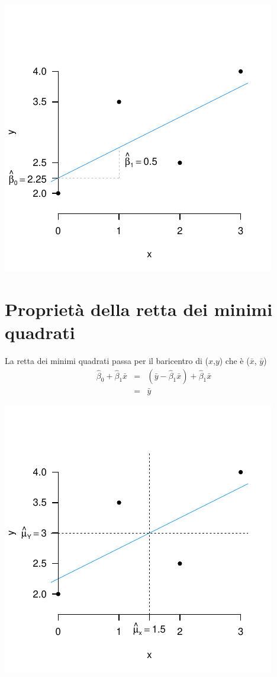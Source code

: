 \documentclass[
  11pt,
]{book}
\theoremstyle{mytheoremstyle}
\theoremstyle{mydefstyle}
\begin{document}
\begin{center}\includegraphics{Appunti_di_Statistica_2025_files/figure-latex/17-regressione-I-42-1} \end{center}

\section{Proprietà della retta dei minimi quadrati}\label{proprietuxe0-della-retta-dei-minimi-quadrati}

La retta dei minimi quadrati passa per il baricentro di (\(x\),\(y\)) che è (\(\bar x\), \(\bar y\))
\begin{eqnarray*}
\hat\beta_0+\hat\beta_1\bar x &=&(\bar y-\hat\beta_1\bar x)+\hat\beta_1\bar x\\
       &=& \bar y
\end{eqnarray*}

\begin{center}\includegraphics{Appunti_di_Statistica_2025_files/figure-latex/17-regressione-I-43-1} \end{center}
\end{document}
